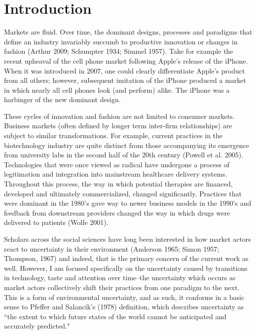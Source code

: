 \chapter{Introduction\label{intro}}

Markets are fluid. Over time, the dominant designs, processes and paradigms that define an industry invariably succumb to productive innovation or changes in fashion (Arthur 2009; Schumpter 1934; Simmel 1957). Take for example the recent upheaval of the cell phone market following Apple's release of the iPhone. When it was introduced in 2007, one could clearly differentiate Apple's product from all others; however, subsequent imitation of the iPhone produced a market in which nearly all cell phones look (and perform) alike. The iPhone was a harbinger of the new dominant design.

These cycles of innovation and fashion are not limited to consumer markets. Business markets (often defined by longer term inter-firm relationships) are subject to similar transformations. For example, current practices in the biotechnology industry are quite distinct from those accompanying its emergence from university labs in the second half of the 20th century (Powell et al. 2005). Technologies that were once viewed as radical have undergone a process of legitimation and integration into mainstream healthcare delivery systems. Throughout this process, the way in which potential therapies are financed, developed and ultimately commercialized, changed significantly. Practices that were dominant in the 1980's gave way to newer business models in the 1990's and feedback from downstream providers changed the way in which drugs were delivered to patients (Wolfe 2001). 

Scholars across the social sciences have long been interested in how market actors react to uncertainty in their environment (Anderson 1965; Simon 1957; Thompson, 1967) and indeed, that is the primary concern of the current work as well. However, I am focused specifically on the uncertainty caused by transitions in technology, taste and attention over time--the uncertainty which occurs as market actors collectively shift their practices from one paradigm to the next. This is a form of environmental uncertainty, and as such, it conforms in a basic sense to Pfeffer and Salancik's (1978) definition, which describes uncertainty as  ``the extent to which future states of the world cannot be anticipated and accurately predicted." 

